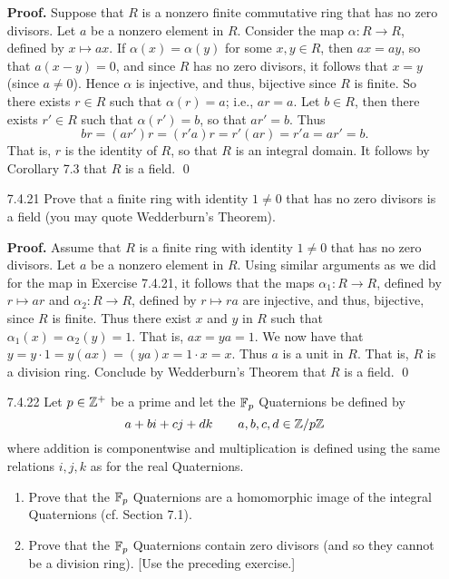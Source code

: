 \begin{enumerate}
      \textbf{Proof.} Suppose that $R$ is a nonzero finite commutative ring that
      has no zero divisors. Let $a$ be a nonzero element in $R$. Consider the
      map $\alpha : R \rightarrow R$, defined by $x \mapsto ax$. If
      $\alpha(x) = \alpha(y)$ for some $x, y \in R$, then $ax = ay$, so that
      $a(x - y) = 0$, and since $R$ has no zero divisors, it follows that
      $x = y$ (since $a \neq 0$). Hence $\alpha$ is injective, and thus,
      bijective since $R$ is finite. So there exists $r \in R$ such that
      $\alpha(r) = a$; i.e., $ar = a$. Let $b \in R$, then there exists
      $r' \in R$ such that $\alpha(r') = b$, so that $ar' = b$. Thus
      $$br = (ar')r = (r'a)r = r'(ar) = r'a = ar' = b.$$
      That is, $r$ is the identity of $R$, so that $R$ is an integral domain. It
      follows by Corollary 7.3 that $R$ is a field. \qed
   \item[7.4.21]  Prove that a finite ring with identity $1 \neq 0$ that has no
                  zero divisors is a field (you may quote Wedderburn's Theorem).
                  
      \textbf{Proof.} Assume that $R$ is a finite ring with identity $1 \neq 0$
      that has no zero divisors. Let $a$ be a nonzero element in $R$. Using
      similar arguments as we did for the map in Exercise 7.4.21, it follows
      that the maps $\alpha_1 : R \rightarrow R$, defined by $r \mapsto ar$ and
      $\alpha_2 : R \rightarrow R$, defined by $r \mapsto ra$ are injective, and
      thus, bijective, since $R$ is finite. Thus there exist $x$ and $y$ in $R$
      such that $\alpha_1(x) = \alpha_2(y) = 1$. That is, $ax = ya = 1$. We now
      have that $y = y \cdot 1 = y(ax) = (ya)x = 1 \cdot x = x$. Thus $a$ is a
      unit in $R$. That is, $R$ is a division ring. Conclude by Wedderburn's
      Theorem that $R$ is a field. \qed
   \item[7.4.22]  Let $p \in \mathbb{Z}^+$ be a prime and let the $\mathbb{F}_p$ Quaternions be
                  defined by
                  $$a + bi + cj + dk \qquad a, b, c, d \in \mathbb{Z}/p\mathbb{Z}$$
                  where addition is componentwise and multiplication is defined
                  using the same relations $i, j, k$ as for the real
                  Quaternions.
                  \begin{enumerate}
                     \item Prove that the $\mathbb{F}_p$ Quaternions are a homomorphic
                           image of the integral Quaternions (cf. Section 7.1).
                     \item Prove that the $\mathbb{F}_p$ Quaternions contain zero
                           divisors (and so they cannot be a division ring).
                           [Use the preceding exercise.]
                  \end{enumerate}
                  

\end{enumerate}
